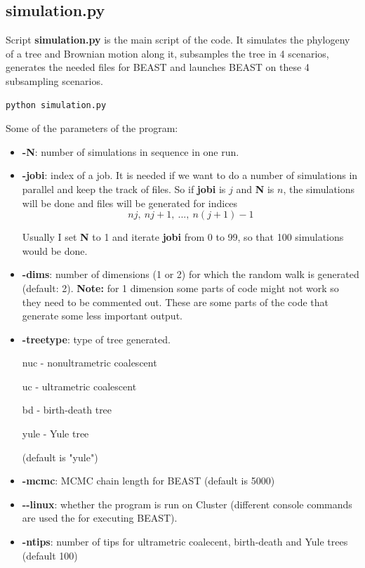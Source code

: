 \subsection*{simulation.py}


Script \textbf{simulation.py} is the main script of the code. It simulates the phylogeny of a tree and Brownian motion along it, subsamples the tree in 4 scenarios, generates the needed files for BEAST and launches BEAST on these 4 subsampling scenarios.

\begin{verbatim}
python simulation.py 
\end{verbatim}

Some of the parameters of the program:

\begin{itemize}
\item \textbf{-N}: number of simulations in sequence in one run.
\item \textbf{-jobi}: index of a job. It is needed if we want to do a number of simulations in parallel and keep the track of files. So if \textbf{jobi} is $j$ and \textbf{N} is $n$, the simulations will be done and files will be generated for indices
$$nj, \ nj+1, \ ... , \ n(j+1) - 1$$ 

Usually I set \textbf{N} to 1 and iterate \textbf{jobi} from 0 to 99, so that 100 simulations would be done.


\item \textbf{-dims}: number of dimensions (1 or 2) for which the random walk is generated (default: 2). \textbf{Note:} for 1 dimension some parts of code might not work so they need to be commented out. These are some parts of the code that generate some less important output.

\item \textbf{-treetype}: type of tree generated.

nuc - nonultrametric coalescent

uc - ultrametric coalescent

bd - birth-death tree

yule - Yule tree

(default is "yule")
\item \textbf{-mcmc}: MCMC chain length for BEAST (default is 5000)

\item \textbf{-{}-linux}: whether the program is run on Cluster (different console commands are used the for executing BEAST).

\item \textbf{-ntips}: number of tips for ultrametric coalecent, birth-death and Yule trees (default 100)


\end{itemize}
